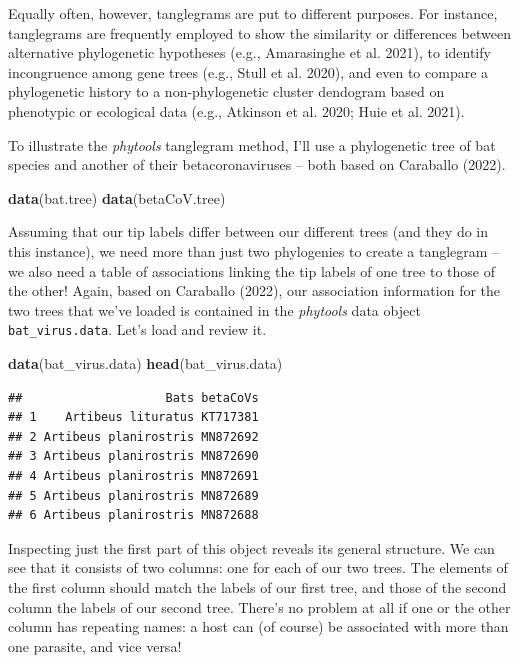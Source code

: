\documentclass[fleqn,10pt,lineno]{wlpeerj}
\newenvironment{Shaded}{\begin{snugshade}}{\end{snugshade}}
\newcommand{\FunctionTok}[1]{\textcolor[rgb]{0.13,0.29,0.53}{\textbf{#1}}}
\newcommand{\NormalTok}[1]{#1}
\providecommand{\DIFdelbegin}{} %
\providecommand{\DIFdelend}{} %
\newcommand{\DIFscaledelfig}{0.5}
\newlength{\DIFdelgraphicswidth} %
\newlength{\DIFdelgraphicsheight} %
\newcommand{\DIFdelincludegraphics}[2][]{%
\sbox{\DIFdelgraphicsbox}{\DIFOincludegraphics[#1]{#2}}%
\settoboxwidth{\DIFdelgraphicswidth}{\DIFdelgraphicsbox} %
\settoboxtotalheight{\DIFdelgraphicsheight}{\DIFdelgraphicsbox} %
\scalebox{\DIFscaledelfig}{%
\parbox[b]{\DIFdelgraphicswidth}{\usebox{\DIFdelgraphicsbox}\\[-\baselineskip] \rule{\DIFdelgraphicswidth}{0em}}\llap{\resizebox{\DIFdelgraphicswidth}{\DIFdelgraphicsheight}{%
\setlength{\unitlength}{\DIFdelgraphicswidth}%
\begin{picture}(1,1)%
\thicklines\linethickness{2pt} %
{\color[rgb]{1,0,0}\put(0,0){\framebox(1,1){}}}%
{\color[rgb]{1,0,0}\put(0,0){\line( 1,1){1}}}%
{\color[rgb]{1,0,0}\put(0,1){\line(1,-1){1}}}%
\end{picture}%
}\hspace*{3pt}}} %
} %
\DeclareRobustCommand{\DIFdelbegin}{\DIFOdelbegin \let\includegraphics\DIFdelincludegraphics} %
\DeclareRobustCommand{\DIFdelend}{\DIFOaddend \let\includegraphics\DIFOincludegraphics} %
\begin{document}
Equally often, however, tanglegrams are put to different purposes. For
instance, tanglegrams are frequently employed to show the similarity or
differences between alternative phylogenetic hypotheses (e.g.,
Amarasinghe et al. 2021), to identify incongruence among gene trees
(e.g., Stull et al. 2020), and even to compare a phylogenetic history to
a non-phylogenetic cluster dendogram based on phenotypic or ecological
data (e.g., Atkinson et al. 2020; Huie et al. 2021). \DIFdelbegin %

\DIFdelend To illustrate the
\emph{phytools} tanglegram method, I'll use a phylogenetic tree of bat
species and another of their betacoronaviruses -- both based on
Caraballo (2022).

\begin{Shaded}
\begin{Highlighting}[]
\FunctionTok{data}\NormalTok{(bat.tree)}
\FunctionTok{data}\NormalTok{(betaCoV.tree)}
\end{Highlighting}
\end{Shaded}

Assuming that our tip labels differ between our different trees (and
they do in this instance), we need more than just two phylogenies to
create a tanglegram -- we also need a table of associations linking the
tip labels of one tree to those of the other! Again, based on Caraballo
(2022), our association information for the two trees that we've loaded
is contained in the \emph{phytools} data object
\texttt{bat\_virus.data}. Let's load and review it.

\begin{Shaded}
\begin{Highlighting}[]
\FunctionTok{data}\NormalTok{(bat\_virus.data)}
\FunctionTok{head}\NormalTok{(bat\_virus.data)}
\end{Highlighting}
\end{Shaded}

\begin{verbatim}
##                    Bats betaCoVs
## 1    Artibeus lituratus KT717381
## 2 Artibeus planirostris MN872692
## 3 Artibeus planirostris MN872690
## 4 Artibeus planirostris MN872691
## 5 Artibeus planirostris MN872689
## 6 Artibeus planirostris MN872688
\end{verbatim}

Inspecting just the first part of this object reveals its general
structure. We can see that it consists of two columns: one for each of
our two trees. The elements of the first column should match the labels
of our first tree, and those of the second column the labels of our
second tree. There's no problem at all if one or the other column has
repeating names: a host can (of course) be associated with more than one
parasite, and vice versa!
\end{document}

